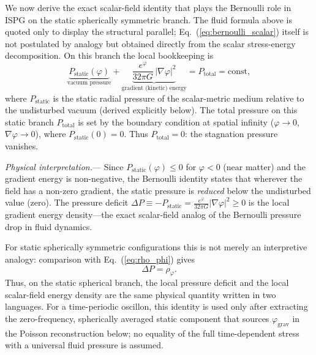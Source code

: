 \documentclass[aps,prd,onecolumn,superscriptaddress,nofootinbib,showpacs,12pt,notitlepage]{revtex4-2}
\begin{document}
We now derive the exact scalar-field identity that plays the
Bernoulli role in ISPG on the static spherically symmetric
branch.  The fluid formula above is quoted only to display the
structural parallel; Eq.~(\ref{eq:bernoulli_scalar}) itself is
not postulated by analogy but obtained directly from the scalar
stress-energy decomposition.  On this branch the local
bookkeeping is
\begin{equation}\label{eq:bernoulli_scalar}
  \boxed{
  \underbrace{P_{\mathrm{static}}(\varphi)}_{\text{vacuum pressure}}
  + \underbrace{\frac{e^{\varphi}}{32\pi G}\,
    |\nabla\varphi|^{2}}_{\text{gradient (kinetic) energy}}
  = P_{\mathrm{total}} = \mathrm{const},
  }
\end{equation}
where $P_{\mathrm{static}}$ is the static radial pressure of the
scalar-metric medium relative to the undisturbed vacuum
(derived explicitly below).  The total pressure on this static branch
$P_{\mathrm{total}}$ is set by the boundary condition
at spatial infinity ($\varphi \to 0$, $\nabla\varphi \to 0$),
where $P_{\mathrm{static}}(0) = 0$.  Thus
$P_{\mathrm{total}} = 0$: the stagnation pressure vanishes.

\textit{Physical interpretation.}---
Since $P_{\mathrm{static}}(\varphi) \leq 0$ for
$\varphi < 0$ (near matter) and the gradient energy is
non-negative, the Bernoulli identity states that wherever
the field has a non-zero gradient, the static pressure
is \emph{reduced} below the undisturbed value (zero).
The pressure deficit $\Delta P \equiv -P_{\mathrm{static}}
= \frac{e^{\varphi}}{32\pi G}|\nabla\varphi|^2 \geq 0$
is the local gradient energy density---the exact
scalar-field analog of the Bernoulli pressure drop
in fluid dynamics.

For static spherically symmetric configurations this is not merely an interpretive
analogy: comparison with Eq.~(\ref{eq:rho_phi}) gives
\begin{equation}
  \Delta P = \rho_\varphi .
\end{equation}
Thus, on the static spherical branch, the local pressure deficit and the local scalar-field
energy density are the same physical quantity written in two
languages.  For a time-periodic oscillon, this identity is used only
after extracting the zero-frequency, spherically averaged static
component that sources $\varphi_{\mathrm{grav}}$ in the Poisson
reconstruction below; no equality of the full time-dependent stress
with a universal fluid pressure is assumed.
\end{document}
